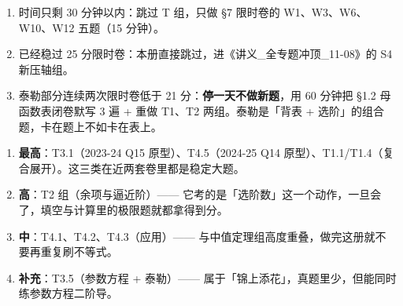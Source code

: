 \documentclass[11pt,a4paper]{ctexart}
\begin{document}
\begin{keypoint}
\begin{enumerate}
\item 时间只剩 30 分钟以内：跳过 T 组，只做 §7 限时卷的 W1、W3、W6、W10、W12 五题（15 分钟）。
\item 已经稳过 25 分限时卷：本册直接跳过，进《讲义\_全专题冲顶\_11-08》的 S4 新压轴组。
\item 泰勒部分连续两次限时卷低于 21 分：\textbf{停一天不做新题}，用 60 分钟把 §1.2 母函数表闭卷默写 3 遍 + 重做 T1、T2 两组。泰勒是「背表 + 选阶」的组合题，卡在题上不如卡在表上。
\end{enumerate}
\end{keypoint}

\begin{keypoint}
\begin{enumerate}
\item \textbf{最高}：T3.1（2023-24 Q15 原型）、T4.5（2024-25 Q14 原型）、T1.1/T1.4（复合展开）。这三类在近两套卷里都是稳定大题。
\item \textbf{高}：T2 组（余项与逼近阶）—— 它考的是「选阶数」这一个动作，一旦会了，填空与计算里的极限题就都拿得到分。
\item \textbf{中}：T4.1、T4.2、T4.3（应用）—— 与中值定理组高度重叠，做完这册就不要再重复刷不等式。
\item \textbf{补充}：T3.5（参数方程 + 泰勒）—— 属于「锦上添花」，真题里少，但能同时练参数方程二阶导。
\end{enumerate}
\end{keypoint}
\end{document}
